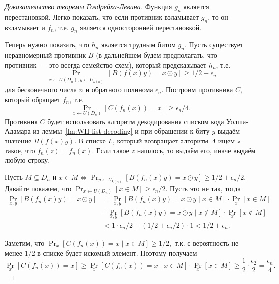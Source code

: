 \documentclass[12pt]{article}
\theoremstyle{definition}
\theoremstyle{plain}
\theoremstyle{remark}
\begin{document}
\begin{proof}[Доказательство теоремы Голдрейха-Левина]
Функция $g_n$ является перестановкой. Легко показать, что если противник взламывает
$g_n$, то он взламывает и $f_n$, т.е. $g_n$ является односторонней перестановкой.

Теперь нужно показать, что $h_n$ является трудным битом $g_n$. 
Пусть существует неравномерный противник $B$ (в дальнейшем будем предполагать, 
что противник~--- это всегда семейство схем), который предсказывает $h_n$, т.е. 
$$\Pr_{\substack{x\gets U(D_n), y\gets U_{k(n)}}} [B(f(x)y) = x\odot y] \ge 1/2 + \epsilon_n$$
для бесконечного числа $n$ и обратного полинома $\epsilon_n$. Построим противника $C$,
который обращает $f_n$, т.е.
$$\Pr_{x\gets U(D_n)}[C(f_n(x)) = x]\ge \epsilon_n/4.$$
Противник $C$ будет использовать алгоритм декодирования списком кода Уолша-Адамара из леммы~\ref{lm:WH-list-decoding}
и при обращении к биту $y$ выдаём значение $B(f(x)y)$.
В списке $L$, который возвращает алгоритм $A$ ищем $z$ такое, что $f_n(z) = f_n(x)$. Если такое $z$ нашлось, то выдаём его, 
иначе выдаём любую строку.

Пусть $M\subseteq D_n$ и $x\in M\iff \Pr_{y\gets U_{k(n)}}[B(f_n(x)y) = x\odot y]\ge 1/2 + \epsilon_n/2.$
Давайте покажем, что $\Pr_{x\gets U(D_n)} [x\in M]\ge \epsilon_n/2$. Пусть это не так, тогда
$$
\begin{aligned}
\Pr_{x,y}[B(f_n(x)y) = x\odot y] &= 
    \Pr_{x,y}[B(f_n(x)y) = x\odot y \mid x    \in M] \cdot \Pr_x[x    \in M]\\ 
&+  \Pr_{x,y}[B(f_n(x)y) = x\odot y \mid x\not\in M] \cdot \Pr_x[x\not\in M]\\
&< 1 \cdot \epsilon_n/2 + (1/2 + \epsilon_n/2) \cdot 1 < 1/2 + \epsilon_n.
\end{aligned}
$$

Заметим, что $\Pr_{x}[C(f_n(x)) = x\mid x\in M]\ge 1/2,$ т.к. с вероятность не менее $1/2$ в списке будет искомый элемент.
Поэтому получаем
$$
\Pr_{x} [C(f_n(x)) = x]\ge \Pr_{x} [C(f_n(x)) = x\mid x\in M]\cdot \Pr_x[x    \in M]
\ge \frac12 \cdot \frac{\epsilon_2}{2} = \frac{\epsilon_n}{4}.
$$
\end{proof}
\end{document}

